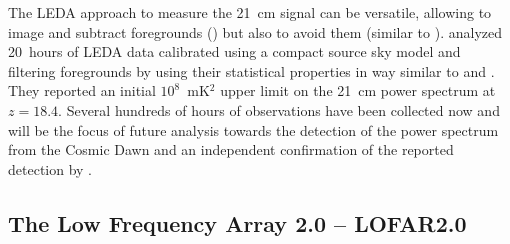 %
The LEDA approach to measure the 21~cm signal can be versatile, allowing to image and subtract foregrounds (\cite{eastwood18}) but also to avoid them (similar to \cite{beardsley16}). \cite{eastwood19} analyzed 20~hours of LEDA data calibrated using a compact source sky model and filtering foregrounds by using their statistical properties in way similar to \cite{dillon14} and \cite{trott16}. They reported an initial $10^8$~mK$^2$ upper limit on the 21~cm power spectrum at $z = 18.4$. Several hundreds of hours of observations have been collected now and will be the focus of future analysis towards the detection of the power spectrum from the Cosmic Dawn and an independent confirmation of the reported detection by \cite{bowman18}.


\subsection{The Low Frequency Array 2.0 -- LOFAR2.0}
\label{section:lofar}

